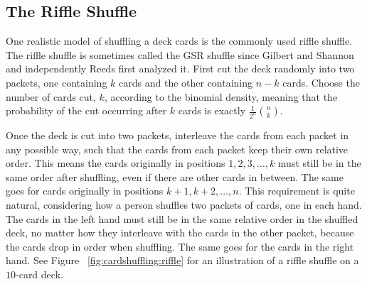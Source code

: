 \documentclass[12pt]{article}
\begin{document}
\subsection*{The Riffle Shuffle}

One realistic model of shuffling a deck cards is the commonly used 
{riffle shuffle}.%
The riffle shuffle is sometimes called the GSR shuffle since Gilbert and
Shannon and independently Reeds first analyzed it.  First cut the deck
randomly into two packets, one containing \( k \) cards and the other
containing \( n-k \) cards.  Choose the number of cards cut, \( k \),
according to the binomial density, meaning that the probability of the
cut occurring after \( k \) cards is exactly \( \frac{1}{2^n}\binom{n}{k}
\).

Once the deck is cut into two packets, interleave the cards from each
packet in any possible way, such that the cards from each packet keep
their own relative order.  This means the cards originally in positions \(
1, 2, 3, \dots, k \) must still be in the same order after shuffling,
even if there are other cards in between.  The same goes for cards
originally in positions \( k+1, k+2, \dots, n \).  This requirement is
quite natural, considering how a person shuffles two packets of cards,
one in each hand.  The cards in the left hand must still be in the same
relative order in the shuffled deck, no matter how they interleave with
the cards in the other packet, because the cards drop in order when
shuffling.  The same goes for the cards in the right hand. See Figure~%
\ref{fig:cardshuffling:riffle} for an illustration of a riffle shuffle
on a \( 10 \)-card deck.
\end{document}
